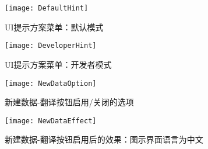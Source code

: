 \documentclass{../../PublicResources/DocClass}
\begin{document}
    \begin{figure}[htbp]
        \begin{minipage}[t]{0.45\textwidth}
            \texttt{[image: DefaultHint]}
            \caption{UI提示方案菜单：默认模式}
            \label{UI提示方案菜单：默认模式}
        \end{minipage}
        \qquad
        \begin{minipage}[t]{0.45\textwidth}
            \texttt{[image: DeveloperHint]}
            \caption{UI提示方案菜单：开发者模式}
            \label{UI提示方案菜单：开发者模式}
        \end{minipage}

        \vspace{1ex}

        \begin{minipage}[t]{0.38\textwidth}
            \texttt{[image: NewDataOption]}
            \caption{新建数据-翻译按钮启用/关闭的选项}
            \label{新建数据选项}
        \end{minipage}
        \begin{minipage}[t]{0.65\textwidth}
            \texttt{[image: NewDataEffect]}
            \caption{新建数据-翻译按钮启用后的效果：图示界面语言为中文}
            \label{新建数据效果}
        \end{minipage}
    \end{figure}
\end{document}
